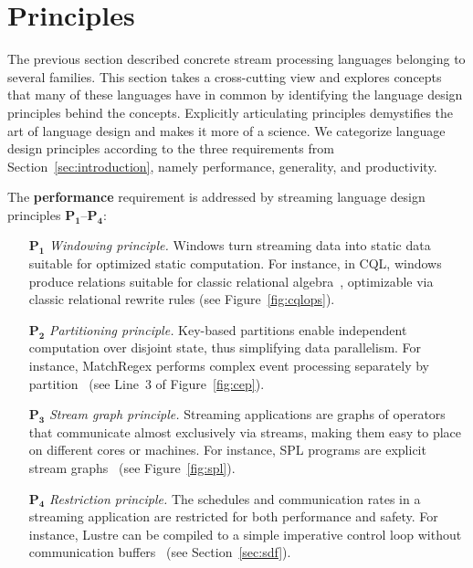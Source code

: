 \section{Principles}\label{sec:principles}

The previous section described concrete stream processing languages
belonging to several families. This section takes a cross-cutting view
and explores concepts that many of these languages have in common by
identifying the language design principles behind the concepts.
Explicitly articulating principles demystifies the art of language
design and makes it more of a science. We categorize language design
principles according to the three requirements from
Section~\ref{sec:introduction}, namely performance, generality, and
productivity.

The \textbf{performance} requirement is addressed by streaming
language design principles $\mathbf{P_1}$--$\mathbf{P_4}$:
\begin{itemize}[leftmargin=6mm]
  \item[$\mathbf{P_1}$] \emph{Windowing principle.} Windows turn streaming
    data into static data suitable for optimized static computation.
    For instance, in CQL, windows produce relations suitable for
    classic relational algebra~\cite{arasu_babu_widom_2006},
    optimizable via classic relational rewrite rules (see
    Figure~\ref{fig:cqlops}).
  \item[$\mathbf{P_2}$] \emph{Partitioning principle.} Key-based partitions
    enable independent computation over disjoint state, thus
    simplifying data parallelism. For instance, MatchRegex performs
    complex event processing separately by
    partition~\cite{hirzel_2012} (see Line~3 of Figure~\ref{fig:cep}).
  \item[$\mathbf{P_3}$] \emph{Stream graph principle.} Streaming
    applications are graphs of operators that communicate almost
    exclusively via streams, making them easy to place on different
    cores or machines. For instance, SPL programs are explicit stream
    graphs~\cite{hirzel_schneider_gedik_2017} (see
    Figure~\ref{fig:spl}).
  \item[$\mathbf{P_4}$] \emph{Restriction principle.} The schedules and
    communication rates in a streaming application are restricted for
    both performance and safety. For instance, Lustre can be compiled
    to a simple imperative control loop without communication
    buffers~\cite{lustre_1987} (see Section~\ref{sec:sdf}).
\end{itemize}

